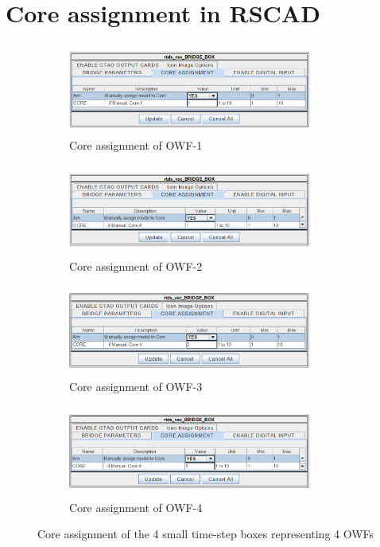 \section{Core assignment in RSCAD}
\begin{figure}[H]
\begin{subfigure}{.5\textwidth}
  \centering
  \includegraphics[height = 3cm,width = 8cm]{Diagrams/Chapter_4/Core_assignment_OWF1.PNG}  
  \caption{Core assignment of OWF-1}
  \label{fig:Core_assignment_OWF1}
\end{subfigure}
\begin{subfigure}{.5\textwidth}
  \centering
  \includegraphics[height = 3cm,width = 8cm]{Diagrams/Chapter_4/Core_assignment_OWF2.PNG}  
  \caption{Core assignment of OWF-2}
  \label{fig:Core_assignment_OWF2}
\end{subfigure}

\newline

\begin{subfigure}{.5\textwidth}
  \centering
  \includegraphics[height = 3cm,width = 8cm]{Diagrams/Chapter_4/Core_assignment_OWF3.PNG}  
  \caption{Core assignment of OWF-3}
  \label{fig:Core_assignment_OWF3}
\end{subfigure}
\begin{subfigure}{.5\textwidth}
  \centering
  \includegraphics[height = 3cm,width = 8cm]{Diagrams/Chapter_4/Core_assignment_OWF4.PNG}  
  \caption{Core assignment of OWF-4}
  \label{fig:Core_assignment_OWF4}
\end{subfigure}
\caption{Core assignment of the 4 small time-step boxes representing 4 OWFs}
\label{fig:Complete_Core_assignment_OWF}
\end{figure}

